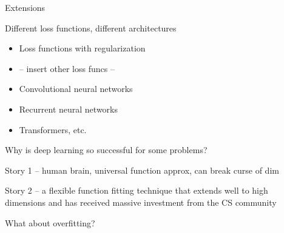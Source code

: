 \begin{frame}{Extensions}

    Different loss functions, different architectures

    \begin{itemize}
        \item Loss functions with regularization
        \vspace{0.5em}
        \item -- insert other loss funcs --
        \vspace{0.5em}
        \item Convolutional neural networks
        \vspace{0.5em}
        \item Recurrent neural networks
        \vspace{0.5em}
        \item Transformers, etc.
    \end{itemize}
    
\end{frame}



\begin{frame}
    
    Why is deep learning so successful for some problems?

    Story 1 -- human brain, universal function approx, can break curse of dim

    Story 2 -- a flexible function fitting technique that extends well to high
        dimensions and has received massive investment from the CS community

\end{frame}


\begin{frame}{What about overfitting?}
    

\end{frame}

\begin{frame}
    
    \begin{figure}
       \centering
    \end{figure}

\end{frame}

